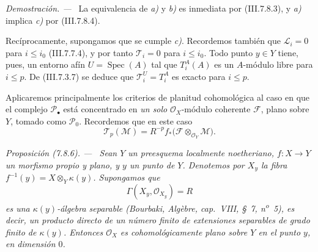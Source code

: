 \documentclass[10pt,oneside]{book}
\newcommand{\kres}{\kappa}
\newcommand{\Spec}{\operatorname{Spec}}
\newcommand{\sref}[2][]{\textup{(#2)}}
\newenvironment{proposition}[1][]{\par\medskip\noindent\itshape Proposición (#1). ---\ }{\par}
\newenvironment{proof}{\par\medskip\noindent\textit{Demostración. ---\ }}{\par}
\begin{document}
\begin{proof}
La equivalencia de \emph{a)} y \emph{b)} es inmediata por \sref{III.7.8.3}, y \emph{a)}
implica \emph{c)} por \sref{III.7.8.4}.

Recíprocamente, supongamos que se cumple \emph{c)}. Recordemos también que
$\mathscr L_i=0$ para $i\leq i_0$ \sref{III.7.7.4}, y por tanto
$\mathscr T_i=0$ para $i\leq i_0$. Todo punto $y\in Y$ tiene, pues,
un entorno afín $U=\Spec(A)$ tal que $T_i^A(A)$ es un $A$-módulo
libre para $i\leq p$. De \sref{III.7.3.7} se deduce que
$\mathscr T_i^U=T_i^A$ es exacto para $i\leq p$.
\end{proof}

Aplicaremos principalmente los criterios de planitud cohomológica al
caso en que el complejo $\mathscr P_\bullet$ está concentrado en \emph{un solo} $\mathscr O_X$-módulo coherente $\mathscr F$, plano
sobre $Y$, tomado como $\mathscr P_0$. Recordemos que en este caso
\[
  \mathscr T_p(\mathscr M)
  =R^{-p}f_*
    \bigl(\mathscr F\otimes_{\mathscr O_Y}\mathscr M\bigr).
\]

\begin{proposition}[7.8.6]
\label{III.7.8.6}
Sean $Y$ un preesquema localmente noetheriano, $f:X\to Y$ un
morfismo propio y plano, y $y$ un punto de $Y$. Denotemos por $X_y$
la fibra $f^{-1}(y)=X\otimes_Y\kres(y)$. Supongamos que
\[
  \Gamma(X_y,\mathscr O_{X_y})=R
\]
es una $\kres(y)$-álgebra separable \textup{(Bourbaki,
\emph{Algèbre}, cap.~VIII, \S~7, n\textsuperscript{o}~5)}, es decir,
un producto directo de un número finito de extensiones separables de
grado finito de $\kres(y)$. Entonces $\mathscr O_X$ es
cohomológicamente plano sobre $Y$ en el punto $y$, en dimensión $0$.
\end{proposition}
\end{document}
